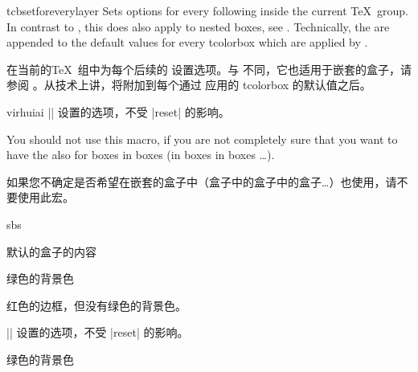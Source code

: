 \begin{docCommand}{tcbsetforeverylayer}{}
Sets options for every following  inside the current \TeX\ group.
In contrast to , this does also
apply to nested boxes, see .
Technically, the  are appended to the default values for every
tcolorbox which are applied by .


在当前的\TeX\ 组中为每个后续的 设置选项。与 不同，它也适用于嵌套的盒子，请参阅 。从技术上讲，将附加到每个通过  应用的 tcolorbox 的默认值之后。%

\begin{引述之言}{virhuiai}
|\tcbsetforeverylayer|%
设置的选项，不受 |reset| 的影响。
\end{引述之言}

You should not use this macro, if you are not completely sure that you
want to have the  also for boxes in boxes (in boxes in boxes \ldots).


如果您不确定是否希望在嵌套的盒子中（盒子中的盒子中的盒子\ldots）也使用，请不要使用此宏。
\begin{dispExample*}{sbs}
\begin{tcolorbox}[title=virhuiai家的盒子]
默认的盒子的内容
\end{tcolorbox}


\begin{tcolorbox}%
[title=All options for this box]
绿色的背景色\par\medskip
\begin{tcolorbox}[title=嵌套的盒子]
红色的边框，但没有绿色的背景色。
\end{tcolorbox}
\end{tcolorbox}
\bigskip

\begin{tcolorbox}[reset,%
title={reset的盒子}]
|\tcbsetforeverylayer|%
设置的选项，不受 |reset| 的影响。
\end{tcolorbox}

\begin{tcolorbox}[title=默认的盒子]
绿色的背景色
\end{tcolorbox}
\end{dispExample*}
\end{docCommand}
